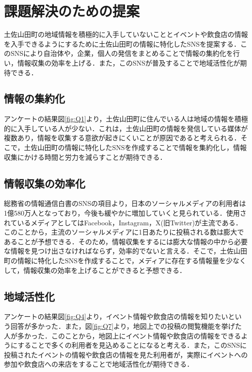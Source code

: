 \section{課題解決のための提案}
土佐山田町の地域情報を積極的に入手していないこととイベントや飲食店の情報を入手できるようにするために土佐山田町の情報に特化したSNSを提案する．このSNSにより自治体や，企業，個人の発信をまとめることで情報の集約化を行い，情報収集の効率を上げる．また，このSNSが普及することで地域活性化が期待できる．

\subsection{情報の集約化}
アンケートの結果図\ref{fig:Q1}より，土佐山田町に住んでいる人は地域の情報を積極的に入手している人が少ない．これは，土佐山田町の情報を発信している媒体が複数あり，情報を収集する意欲が起きにくいことが原因であると考えられる．そこで，土佐山田町の情報に特化したSNSを作成することで情報を集約化し，情報収集にかける時間と労力を減らすことが期待できる．

\subsection{情報収集の効率化}
総務省の情報通信白書\cite{label3}のSNSの項目より，日本のソーシャルメディアの利用者は1億580万人となっており，今後も緩やかに増加していくと見られている．使用されているメディアとしてはFacebook，Instagram，X(旧Twitter)が主流である．このことから，主流のソーシャルメディアに1日あたりに投稿される数は膨大であることが予想できる．そのため，情報収集をするには膨大な情報の中から必要な情報を見つけ出さなければならず，効率的でないと言える．そこで，土佐山田町の情報に特化したSNSを作成することで，メディアに存在する情報量を少なくして，情報収集の効率を上げることができると予想できる．

\subsection{地域活性化}
アンケートの結果図\ref{fig:Q4}より，イベント情報や飲食店の情報を知りたいという回答が多かった．また，図\ref{fig:Q7}より，地図上での投稿の閲覧機能を挙げた人が多かった．このことから，地図上にイベント情報や飲食店の情報をできるようにすることで多くの利用者を見込めることになると考える．また，このSNSに投稿されたイベントの情報や飲食店の情報を見た利用者が，実際にイベントへの参加や飲食店への来店をすることで地域活性化が期待できる．